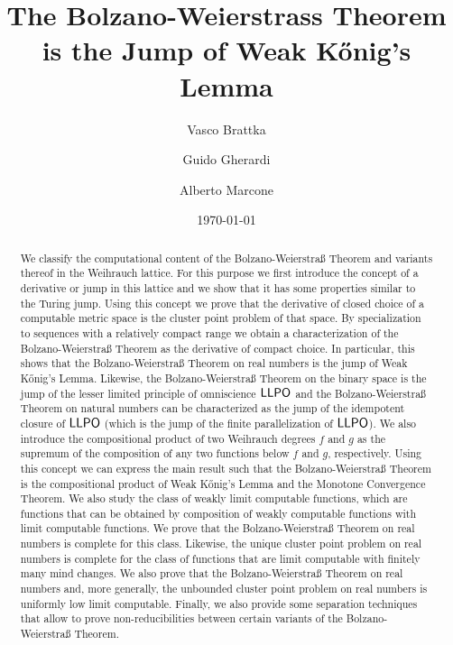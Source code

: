 \documentclass[a4paper]{amsart}
\title[The Bolzano-Weierstrass Theorem is the Jump of Weak K\H{o}nig's Lemma]{The Bolzano-Weierstrass Theorem\\ is the Jump of Weak K\H{o}nig's Lemma}
\author{Vasco Brattka}
\author{Guido Gherardi}
\author{Alberto Marcone}
\date{\today}
\def\LLPO{\text{\rm\sffamily LLPO}}
\def\LLPO{\mbox{\rm\sffamily LLPO}}
\theoremstyle{definition}
\begin{document}
\maketitle


\begin{abstract}
We classify the computational content of the Bolzano-Weierstra\ss{} Theorem and variants thereof in the 
Weihrauch lattice. For this purpose we first introduce the concept of a derivative or jump in this lattice and we show
that it has some properties similar to the Turing jump. Using this concept we prove that the derivative
of closed choice of a computable metric space is the cluster point problem of that space. 
By specialization to sequences with a relatively compact range we obtain a characterization
of the Bolzano-Weierstra\ss{} Theorem as the derivative of compact choice. 
In particular, this shows that the Bolzano-Weierstra\ss{} Theorem on real numbers is
the jump of Weak K\H{o}nig's Lemma. 
Likewise, the Bolzano-Weierstra\ss{} Theorem
on the binary space is the jump of the lesser limited principle of omniscience $\LLPO$
and the Bolzano-Weierstra\ss{} Theorem on natural numbers can be characterized
as the jump of the idempotent closure of $\LLPO$ (which is the jump of the finite parallelization of $\LLPO$). 
We also introduce the compositional product of two Weihrauch degrees $f$ and $g$ as the supremum of the
composition of any two functions below $f$ and $g$, respectively. 
Using this concept we can express the main
result such that the Bolzano-Weierstra\ss{} Theorem is the
compositional product of Weak K\H{o}nig's Lemma and the Monotone Convergence Theorem.
We also study the class of weakly limit computable functions, which are functions
that can be obtained by composition of weakly computable functions with limit computable
functions. We prove that the Bolzano-Weierstra\ss{} Theorem on real numbers is complete
for this class. Likewise, the unique cluster point problem on real numbers is complete
for the class of functions that are limit computable with finitely many mind changes.
We also prove that the Bolzano-Weierstra\ss{} Theorem on real numbers and, more generally,
the unbounded cluster point problem on real numbers is uniformly low limit computable. 
Finally, we also provide some separation techniques that allow to prove non-reducibilities between
certain variants of the Bolzano-Weierstra\ss{} Theorem.
\end{abstract}
\end{document}
